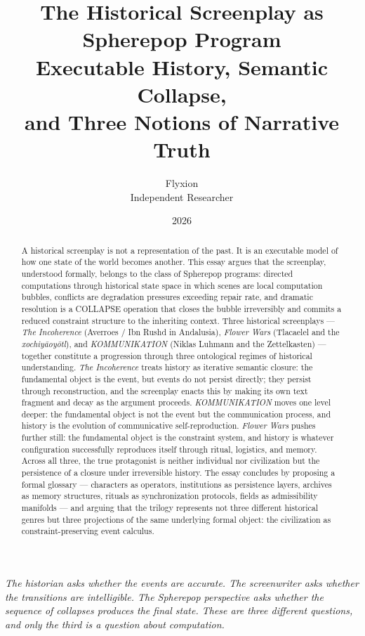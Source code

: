 \documentclass[11pt, a4paper]{article}
\title{\textbf{The Historical Screenplay as Spherepop Program}\\
{\large Executable History, Semantic Collapse,\\
and Three Notions of Narrative Truth}}
\author{Flyxion \\ \small Independent Researcher}
\date{2026}
\theoremstyle{definition}
\theoremstyle{remark}
\begin{document}
\maketitle

\begin{abstract}
A historical screenplay is not a representation of the past. It is an
executable model of how one state of the world becomes another. This essay
argues that the screenplay, understood formally, belongs to the class of
Spherepop programs: directed computations through historical state space in
which scenes are local computation bubbles, conflicts are degradation pressures
exceeding repair rate, and dramatic resolution is a COLLAPSE operation that
closes the bubble irreversibly and commits a reduced constraint structure to
the inheriting context. Three historical screenplays --- \textit{The
Incoherence} (Averroes / Ibn Rushd in Andalusia), \textit{Flower Wars}
(Tlacaelel and the \textit{xochiy\={a}oy\={o}tl}), and \textit{KOMMUNIKATION}
(Niklas Luhmann and the Zettelkasten) --- together constitute a progression
through three ontological regimes of historical understanding. \textit{The
Incoherence} treats history as iterative semantic closure: the fundamental
object is the event, but events do not persist directly; they persist through
reconstruction, and the screenplay enacts this by making its own text fragment
and decay as the argument proceeds. \textit{KOMMUNIKATION} moves one level
deeper: the fundamental object is not the event but the communication process,
and history is the evolution of communicative self-reproduction.
\textit{Flower Wars} pushes further still: the fundamental object is the
constraint system, and history is whatever configuration successfully
reproduces itself through ritual, logistics, and memory. Across all three,
the true protagonist is neither individual nor civilization but the persistence
of a closure under irreversible history. The essay concludes by proposing a
formal glossary --- characters as operators, institutions as persistence layers,
archives as memory structures, rituals as synchronization protocols, fields as
admissibility manifolds --- and arguing that the trilogy represents not three
different historical genres but three projections of the same underlying formal
object: the civilization as constraint-preserving event calculus.
\end{abstract}

\newpage

\epigraph{\textit{The historian asks whether the events are accurate.
The screenwriter asks whether the transitions are intelligible. The Spherepop
perspective asks whether the sequence of collapses produces the final state.
These are three different questions, and only the third is a question about
computation.}}{}
\end{document}
